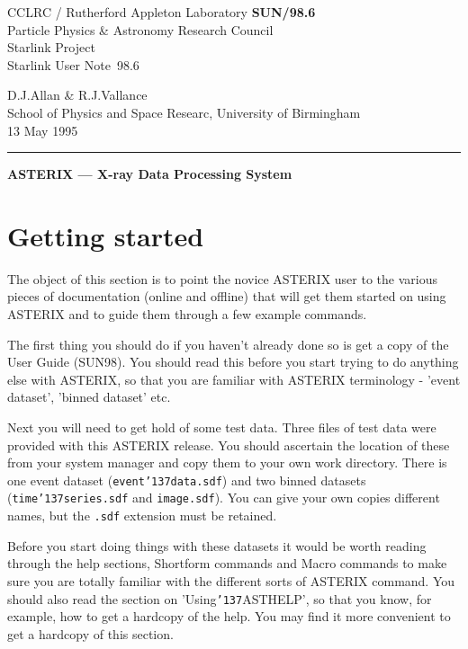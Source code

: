 \documentclass{book}
\newcommand{\stardoccategory}  {Starlink User Note}
\newcommand{\stardocinitials}  {SUN}
\newcommand{\stardocnumber}    {98.6}
\newcommand{\stardocauthors}   {D.J.Allan \& R.J.Vallance}
\newcommand{\stardocdate}      {13 May 1995}
\newcommand{\stardoctitle}     {ASTERIX --- X-ray Data Processing System}
\newcommand{\stardocname}{\stardocinitials /\stardocnumber}
\renewcommand{\_}{{\tt\char'137}}     %
\begin{document}
\thispagestyle{empty}
CCLRC / {\sc Rutherford Appleton Laboratory} \hfill {\bf \stardocname}\\
{\large Particle Physics \& Astronomy Research Council}\\
{\large Starlink Project\\}
{\large \stardoccategory\ \stardocnumber}

\begin{flushright}
\stardocauthors\\
School of Physics and Space Researc, University of Birmingham\\
\stardocdate
\end{flushright}
\vspace{-4mm}
\rule{\textwidth}{0.5mm}
\vspace{5mm}
\begin{center}
{\Large\bf \stardoctitle}
\end{center}
\vspace{5mm}
\setlength{\parskip}{0mm}
\tableofcontents
\setlength{\parskip}{\medskipamount}
\markright{\stardocname}
\chapter{Getting started}
The object of this section is to point the novice ASTERIX user to the
various pieces of documentation (online and offline) that will get them
started on using ASTERIX and to guide them through a few example
commands.
 
The first thing you should do if you haven't already done so is get a
copy of the User Guide (SUN98). You should read this before you start
trying to do anything else with ASTERIX, so that you are familiar with
ASTERIX terminology - 'event dataset', 'binned dataset' etc.
 
Next you will need to get hold of some test data. Three files of test
data were provided with this ASTERIX release. You should ascertain the
location of these from your system manager and copy them to your own
work directory. There is one event dataset ({\tt event\_data.sdf}) and two
binned datasets ({\tt time\_series.sdf} and {\tt image.sdf}). You can give your own
copies different names, but the {\tt .sdf} extension must be retained.
 
Before you start doing things with these datasets it would be worth
reading through the help sections, Shortform commands and
Macro commands to make sure you are totally familiar with the different
sorts of ASTERIX command. You should also read the section on
'Using\_ASTHELP', so that you know, for example, how to get a hardcopy
of the help. You may find it more convenient to get a hardcopy of
this section.
 
\end{document}
